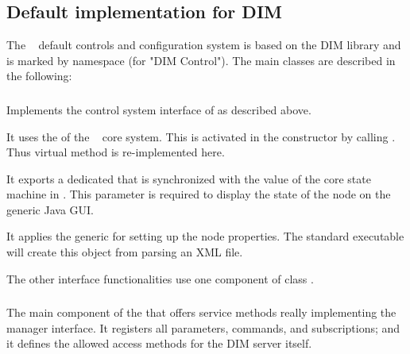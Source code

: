 \subsection{Default implementation for DIM}
\label{prog_manager_controls_DIM}
The \dabc~ default controls and configuration system 
is based on the DIM library \cite{DIM} and is marked by namespace
 (for "DIM Control"). 
The main classes are described in the following:

\subsubsection{}
\label{prog_manager_controls_DIM_manager}
Implements the control system interface of
 as described above. 

\begin{compactenum}

\item It uses the  of the \dabc~ core system.
This is activated in the constructor by calling
. Thus virtual method 
is  re-implemented here.

\item It exports a dedicated  that is
synchronized with the value of the core state machine in . 
This parameter is required to display the state of the node on the generic
Java GUI.

\item It applies the generic   for setting up
the node properties. The standard executable   will create 
this object from parsing an XML file. 

\item The other interface functionalities use one
component of class .

\end{compactenum}




\subsubsection{}
\label{prog_manager_controls_DIM_registry}
The main component of the  that
offers service methods really implementing the manager interface.
It registers all parameters, commands, and subscriptions; 
and it defines the allowed access methods for the DIM server itself.
 
